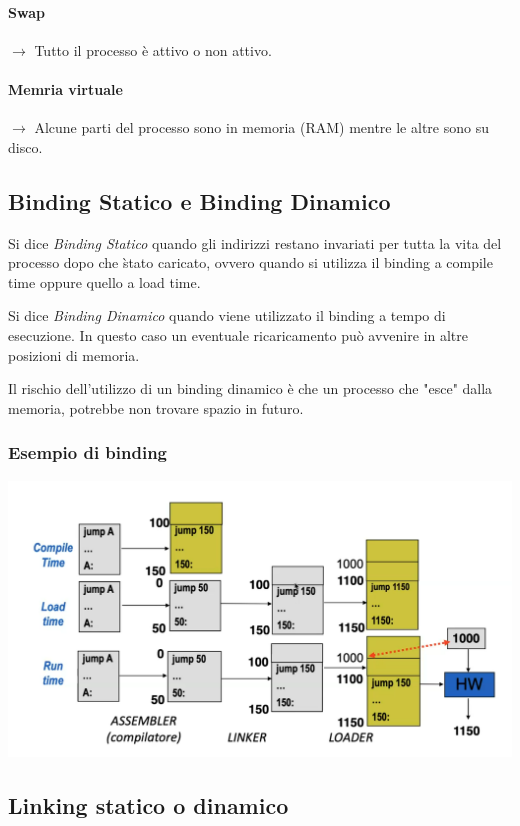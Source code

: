 \documentclass[a4paper,12pt, twoside]{report}
\begin{document}
\paragraph{Swap} $\to$ Tutto il processo \`e attivo o non attivo. 
\paragraph{Memria virtuale} $\to$ Alcune parti del processo sono in memoria (RAM) mentre le altre sono su disco.


\subsection{Binding Statico e Binding Dinamico}

Si dice \emph{Binding Statico} quando gli indirizzi restano invariati per tutta la vita del processo dopo che \` stato caricato, ovvero quando si utilizza il binding a compile time oppure quello a load time.

Si dice \emph{Binding Dinamico} quando viene utilizzato il binding a tempo di esecuzione. In questo caso un eventuale ricaricamento pu\`o avvenire in altre posizioni di memoria. 

Il rischio dell'utilizzo di un binding dinamico \`e che un processo che "esce" dalla memoria, potrebbe non trovare spazio in futuro.

\subsubsection{Esempio di binding}
\begin{center}
\includegraphics[scale=0.2]{bindingExample}
\end{center}

\subsection{Linking statico o dinamico}
\end{document}
